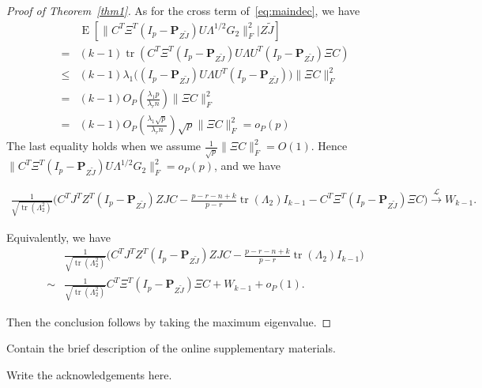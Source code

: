 \documentclass[12pt]{article} %
\DeclareMathOperator{\mytr}{tr}
\DeclareMathOperator{\myE}{E}
\newcommand{\bP}{\mathbf{P}}
\theoremstyle{definition}
\begin{document}
\begin{proof}[\textrm{Proof of Theorem~\ref{thm1}}]
As for the cross term of~\eqref{eq:maindec}, we have
$$
\begin{aligned}
    &\myE [\|C^T \Xi^T (I_p -\bP_{Z\tilde{J}})U\Lambda^{1/2}G_2\|_F^2|Z\tilde{J}]\\
    = &
    (k-1)\mytr(C^T \Xi^T (I_p -\bP_{Z\tilde{J}})U\Lambda U^T (I_p -\bP_{Z\tilde{J}})\Xi C)\\
    \leq &
    (k-1)\lambda_1\big((I_p -\bP_{Z\tilde{J}})U\Lambda U^T (I_p -\bP_{Z\tilde{J}})\big)\|\Xi C\|^2_F\\
    = &
    (k-1) O_P(\frac{\lambda_1 p}{\lambda_r n})  \|\Xi C\|^2_F\\
    = &
    (k-1) O_P(\frac{\lambda_1 \sqrt{p}}{\lambda_r n}) \sqrt{p}  \|\Xi C\|^2_F=o_P(p)
\end{aligned}
$$
The last equality holds when we assume $\frac{1}{\sqrt{p}}\|\Xi C\|_F^2=O(1)$. Hence $\|C^T \Xi^T (I_p -\bP_{Z\tilde{J}})U\Lambda^{1/2}G_2\|_F^2=o_P(p)$, and we have

$$
\begin{aligned}
\frac{1}{\sqrt{\mytr(\Lambda_2^2)}}
    \big( C^TJ^T Z^T(I_p-\bP_{Z\tilde J}) ZJC
    -\tfrac{p-r-n+k}{p-r}\mytr(\Lambda_2)I_{k-1} -C^T \Xi^T (I_p-\bP_{Z\tilde{J}})\Xi C\big)
\xrightarrow{\mathcal{L}} W_{k-1}.
\end{aligned}
$$

    Equivalently, we have
    $$
    \begin{aligned}
        &\frac{1}{\sqrt{\mytr(\Lambda_2^2)}} {\Big(C^TJ^T Z^T(I_p-\bP_{Z\tilde J}) ZJC- \frac{p-r-n+k}{p-r}\mytr(\Lambda_2)I_{k-1}}\Big)\\
        \sim&
\frac{1}{\sqrt{\mytr(\Lambda_2^2)}} C^T \Xi^T (I_p-\bP_{Z\tilde{J}})\Xi C
        +W_{k-1}+o_P(1).
    \end{aligned}
    $$

    Then the conclusion follows by taking the maximum eigenvalue.
\end{proof}

\vskip 14pt

Contain
the brief description of the online supplementary materials.
\par
\vskip 14pt

Write the acknowledgements here.
\par
\end{document}
